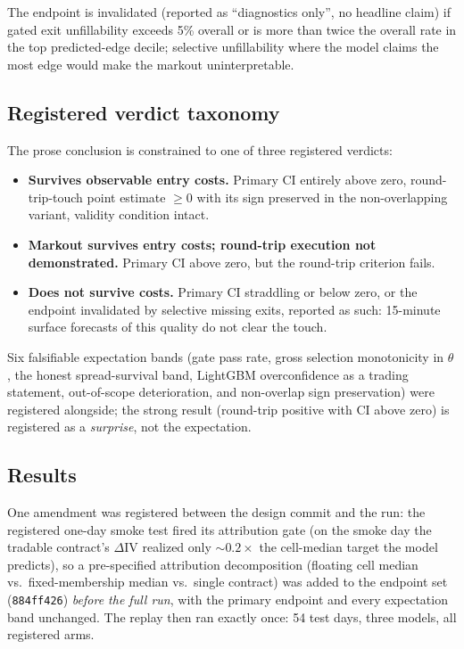 \documentclass[11pt]{article}
\newcommand{\dIV}{\Delta\mathrm{IV}}
\begin{document}
The endpoint is invalidated (reported as ``diagnostics only'', no headline
claim) if gated exit unfillability exceeds 5\% overall or is more than twice
the overall rate in the top predicted-edge decile; selective
unfillability where the model claims the most edge would make the markout
uninterpretable.

\subsection{Registered verdict taxonomy}

The prose conclusion is constrained to one of three registered verdicts:

\begin{itemize}
  \item \textbf{Survives observable entry costs.} Primary CI entirely above
    zero, round-trip-touch point estimate $\geq 0$ with its sign preserved
    in the non-overlapping variant, validity condition intact.
  \item \textbf{Markout survives entry costs; round-trip execution not
    demonstrated.} Primary CI above zero, but the round-trip criterion
    fails.
  \item \textbf{Does not survive costs.} Primary CI straddling or below
    zero, or the endpoint invalidated by selective missing exits, reported as such: 15-minute surface forecasts of this quality do not
    clear the touch.
\end{itemize}

Six falsifiable expectation bands (gate pass rate, gross selection
monotonicity in $\theta$, the honest spread-survival band, LightGBM
overconfidence as a trading statement, out-of-scope deterioration, and
non-overlap sign preservation) were registered alongside; the strong result (round-trip positive with CI above zero) is registered as a
\emph{surprise}, not the expectation.

\subsection{Results}
\label{sec:replay-results}

One amendment was registered between the design commit and the run: the
registered one-day smoke test fired its attribution gate (on the smoke day the tradable contract's $\dIV$ realized only ${\sim}0.2\times$ the
cell-median target the model predicts), so a pre-specified attribution
decomposition (floating cell median vs.\ fixed-membership median vs.\
single contract) was added to the endpoint set (\texttt{884ff426})
\emph{before the full run}, with the primary endpoint and every expectation
band unchanged. The replay then ran exactly once: 54 test days, three
models, all registered arms.
\end{document}
